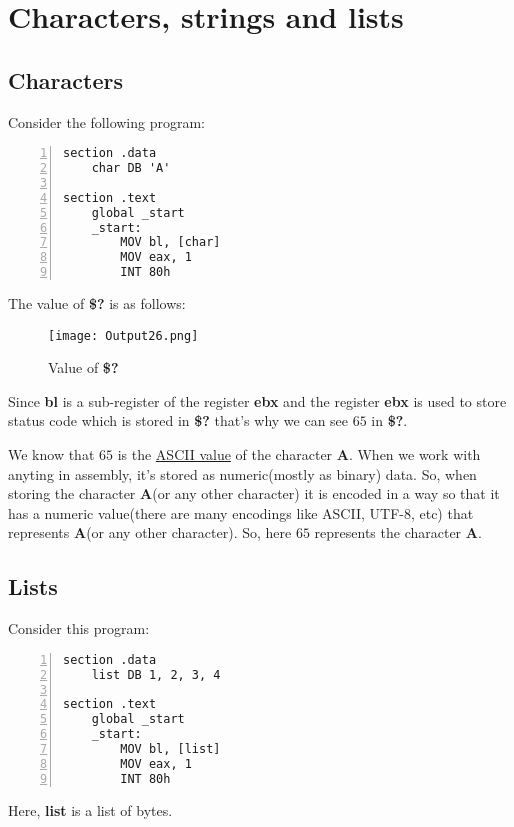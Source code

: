 \documentclass{article}
\makeatletter
\renewcommand\paragraph{\@startsection{paragraph}{4}{\z@}{-3.25ex \@plus -1ex \@minus -.2ex}{1.5ex \@plus .2ex}{\normalfont\normalsize\bfseries}}
\makeatother
\begin{document}
\section{Characters, strings and lists}
\subsection{Characters}\label{sec:chars}
\paragraph{}
Consider the following program:
\begin{Verbatim}[numbers=left, frame=single]
section .data
	char DB 'A'
	
section .text
	global _start
	_start:
		MOV bl, [char]
		MOV eax, 1
		INT 80h
\end{Verbatim}

The value of \textbf{\$?} is as follows:
\begin{figure}[h]
\centering
\texttt{[image: Output26.png]}
\caption{Value of \textbf{\$?}}
\label{fig:statusCode}
\end{figure}

Since \textbf{bl} is a sub-register of the register \textbf{ebx} and the register \textbf{ebx} is used to store status code which is stored in \textbf{\$?} that's why we can see $65$ in \textbf{\$?}.

\vspace{10pt}
We know that $65$ is the \href{https://www.cs.cmu.edu/~pattis/15-1XX/common/handouts/ascii.html}{ASCII value} of the character \textbf{A}. When we work with anyting in assembly, it's stored as numeric(mostly as binary) data. So, when storing the character \textbf{A}(or any other character) it is encoded in a way so that it has a numeric value(there are many encodings like ASCII, UTF-8, etc) that represents \textbf{A}(or any other character). So, here $65$ represents the character \textbf{A}.
\newpage
\subsection{Lists}\label{sec:lists}
\paragraph{}
Consider this program:

\begin{Verbatim}[numbers=left, frame=single]
section .data
	list DB 1, 2, 3, 4

section .text
	global _start
	_start:
		MOV bl, [list]
		MOV eax, 1
		INT 80h
\end{Verbatim}
Here, \textbf{list} is a list of bytes.
\end{document}
